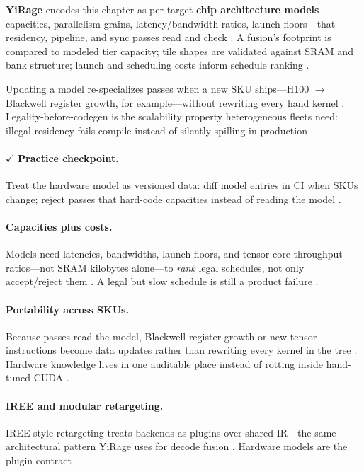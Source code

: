 \textbf{YiRage} encodes this chapter as per-target \textbf{chip architecture models}---capacities, parallelism grains, latency/bandwidth ratios, launch floors---that residency, pipeline, and sync passes read and check \citep{yirage2026,chen2020compilerbasedhardw}.
A fusion's footprint is compared to modeled tier capacity; tile shapes are validated against SRAM and bank structure; launch and scheduling costs inform schedule ranking \citep{wu2024mirage}.

Updating a model re-specializes passes when a new SKU ships---H100 $\rightarrow$ Blackwell register growth, for example---without rewriting every hand kernel \citep{iree2024,patel2025llminference}.
Legality-before-codegen is the scalability property heterogeneous fleets need: illegal residency fails compile instead of silently spilling in production \citep{yirage2026,amd2024xdna}.

\paragraph{$\checkmark$ Practice checkpoint.}
Treat the hardware model as versioned data: diff model entries in CI when SKUs change; reject passes that hard-code capacities instead of reading the model \citep{yirage2026}.

\paragraph{Capacities plus costs.}
Models need latencies, bandwidths, launch floors, and tensor-core throughput ratios---not SRAM kilobytes alone---to \emph{rank} legal schedules, not only accept/reject them \citep{nvidia2022hopper,shah2024flashattention3,wu2024mirage}.
A legal but slow schedule is still a product failure \citep{patel2025llminference,memoryfloor2026}.

\paragraph{Portability across SKUs.}
Because passes read the model, Blackwell register growth or new tensor instructions become data updates rather than rewriting every kernel in the tree \citep{yirage2026,iree2024}.
Hardware knowledge lives in one auditable place instead of rotting inside hand-tuned CUDA \citep{chen2020compilerbasedhardw}.

\paragraph{IREE and modular retargeting.}
IREE-style retargeting treats backends as plugins over shared IR---the same architectural pattern YiRage uses for decode fusion \citep{iree2024,yirage2026,chen2020compilerbasedhardw}.
Hardware models are the plugin contract \citep{patel2025llminference}.

